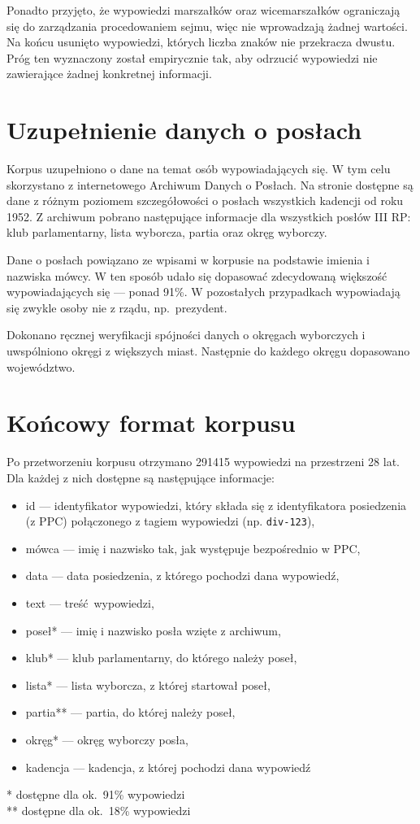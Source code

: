   Ponadto przyjęto, że wypowiedzi marszałków oraz wicemarszałków ograniczają się do zarządzania procedowaniem sejmu,
    więc nie wprowadzają żadnej wartości.
  Na końcu usunięto wypowiedzi, których liczba znaków nie przekracza dwustu.
  Próg ten wyznaczony został empirycznie tak, aby odrzucić wypowiedzi nie zawierające żadnej konkretnej informacji.

\section{Uzupełnienie danych o posłach}
  Korpus uzupełniono o dane na temat osób wypowiadających się.
  W tym celu skorzystano z internetowego Archiwum Danych o Posłach\cite{archiwum_posl}.
  Na stronie dostępne są dane z różnym poziomem szczegółowości o posłach wszystkich kadencji od roku 1952.
  Z archiwum pobrano następujące informacje dla wszystkich posłów III RP: klub parlamentarny, lista wyborcza, partia oraz okręg wyborczy.

  Dane o posłach powiązano ze wpisami w korpusie na podstawie imienia i nazwiska mówcy.
  W ten sposób udało się dopasować zdecydowaną większość wypowiadających się --- ponad 91\%.
  W pozostałych przypadkach wypowiadają się zwykle osoby nie z rządu, np.\ prezydent.

  Dokonano ręcznej weryfikacji spójności danych o okręgach wyborczych i uwspólniono okręgi z większych miast.
  Następnie do każdego okręgu dopasowano województwo.

\section{Końcowy format korpusu}
  Po przetworzeniu korpusu otrzymano 291415 wypowiedzi na przestrzeni 28 lat.
  Dla każdej z nich dostępne są następujące informacje:
  \begin{itemize}
    \item id --- identyfikator wypowiedzi, który składa się z identyfikatora posiedzenia (z PPC) połączonego z tagiem wypowiedzi (np. \verb|div-123|),
    \item mówca --- imię i nazwisko tak, jak występuje bezpośrednio w PPC,
    \item data --- data posiedzenia, z którego pochodzi dana wypowiedź,
    \item text --- treść wypowiedzi,
    \item poseł* --- imię i nazwisko posła wzięte z archiwum,
    \item klub* --- klub parlamentarny, do którego należy poseł,
    \item lista* --- lista wyborcza, z której startował poseł,
    \item partia** --- partia, do której należy poseł,
    \item okręg* --- okręg wyborczy posła,
    \item kadencja --- kadencja, z której pochodzi dana wypowiedź
  \end{itemize}
  \vspace{1em}
  * dostępne dla ok.\ 91\% wypowiedzi\\
  ** dostępne dla ok.\ 18\% wypowiedzi